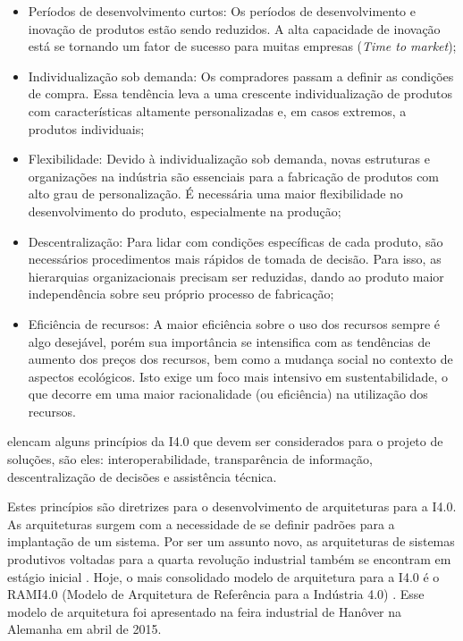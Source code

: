 \begin{itemize}

	\item Períodos de desenvolvimento curtos: Os períodos de desenvolvimento e inovação de produtos estão sendo reduzidos. A alta capacidade de inovação está se tornando um fator de sucesso para muitas empresas (\textit{Time to market});

	\item Individualização sob demanda: Os compradores passam a definir as condições de compra. Essa tendência leva a uma crescente individualização de produtos com características altamente personalizadas e, em casos extremos, a produtos individuais;

	\item Flexibilidade: Devido à individualização sob demanda, novas estruturas e organizações na indústria são essenciais para a fabricação de produtos com alto grau de personalização. É necessária uma maior flexibilidade no desenvolvimento do produto, especialmente na produção;

	\item Descentralização: Para lidar com condições específicas de cada produto, são necessários procedimentos mais rápidos de tomada de decisão. Para isso, as hierarquias organizacionais precisam ser reduzidas, dando ao produto maior independência sobre seu próprio processo de fabricação;

	\item Eficiência de recursos: A maior eficiência sobre o uso dos recursos sempre é algo desejável, porém sua importância se intensifica com as tendências de aumento dos preços dos recursos, bem como a mudança social no contexto de aspectos ecológicos. Isto exige um foco mais intensivo em sustentabilidade, o que decorre em uma maior racionalidade (ou eficiência) na utilização dos recursos.

\end{itemize}

 elencam alguns princípios da I4.0 que devem ser considerados para o projeto de soluções, são eles: interoperabilidade, transparência de informação, descentralização de decisões e assistência técnica.

Estes princípios são diretrizes para o desenvolvimento de arquiteturas para a I4.0. As arquiteturas surgem com a necessidade de se definir padrões para a implantação de um sistema. Por ser um assunto novo, as arquiteturas de sistemas produtivos voltadas para a quarta revolução industrial também se encontram em estágio inicial \cite{pisching2018arquitetura}. Hoje, o mais consolidado modelo de arquitetura para a I4.0 é o RAMI4.0 (Modelo de Arquitetura de Referência para a Indústria 4.0) \cite{hankel2015rami}. Esse modelo de arquitetura foi apresentado na feira industrial de Hanôver na Alemanha em abril de 2015.

